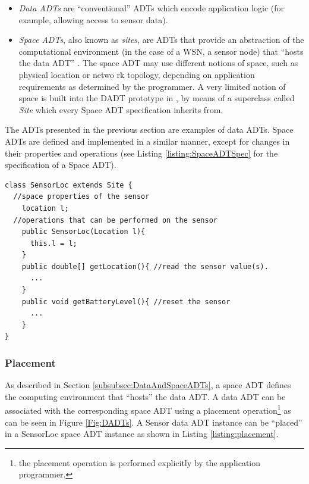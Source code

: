 \begin{itemize}
  \item \emph{Data ADTs} are ``conventional'' ADTs which encode
  application logic (for example, allowing access to sensor data).
  \item \emph{Space ADTs}, also known as \emph{sites}, are ADTs that provide an
  abstraction of the computational environment (in the case of a WSN, a sensor
  node) that ``hosts the data ADT'' \cite{migliavacca_DADT:2006}. The space ADT
  may use different notions of space, such as physical location or netwo
 rk topology, depending on application requirements as determined by the
 programmer. A very limited notion of space is built into the DADT prototype in
 \cite{migliavacca_DADT:2006}, by means of a superclass called \emph{Site} which
 every Space ADT specification inherits from.
\end{itemize}

The ADTs presented in the previous section are examples of data ADTs. Space
ADTs are defined and implemented in a similar manner, except for changes in
their properties and operations (see Listing \ref{listing:SpaceADTSpec} for the
specification of a Space ADT).  
 
 \begin{lstlisting}[frame=trbl, basewidth={0.55em, 0.6em}, captionpos=b, basicstyle=\ttfamily\footnotesize, breaklines, caption = Sensor Space ADT specification (reproduced from \cite{migliavacca_DADT:2006}), label = listing:SpaceADTSpec ]
class SensorLoc extends Site {
  //space properties of the sensor 
	location l;
  //operations that can be performed on the sensor
	public SensorLoc(Location l){
	  this.l = l;
	}
	public double[] getLocation(){ //read the sensor value(s).
	  ...
	}
	public void getBatteryLevel(){ //reset the sensor
	  ...
	}
}
\end{lstlisting}
 
\subsubsection{Placement}
 
As described in Section \ref{subsubsec:DataAndSpaceADTs}, a space ADT defines
the computing environment that ``hosts'' the data ADT. A data ADT can be
associated with the corresponding space ADT using a placement operation\footnote{the placement operation is
performed explicitly by the application programmer.} as can be seen in Figure \ref{Fig:DADTs}.
A Sensor data ADT
instance can be ``placed'' in a SensorLoc space ADT instance as shown in Listing
\ref{listing:placement}. 

